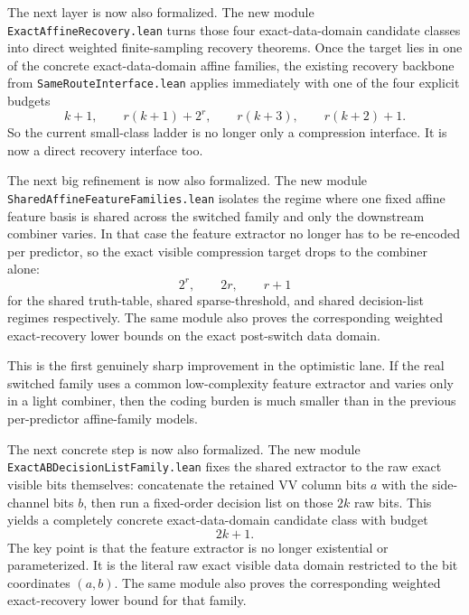 \documentclass[11pt]{article}
\theoremstyle{remark}
\begin{document}
The next layer is now also formalized.  The new module
\texttt{ExactAffineRecovery.lean} turns those four exact-data-domain candidate
classes into direct weighted finite-sampling recovery theorems.  Once the
target lies in one of the concrete exact-data-domain affine families, the existing
recovery backbone from \texttt{SameRouteInterface.lean} applies immediately
with one of the four explicit budgets
\[
  k+1, \qquad r(k+1)+2^r, \qquad r(k+3), \qquad r(k+2)+1.
\]
So the current small-class ladder is no longer only a compression interface.
It is now a direct recovery interface too.

The next big refinement is now also formalized.  The new module
\texttt{SharedAffineFeatureFamilies.lean} isolates the regime where one fixed
affine feature basis is shared across the switched family and only the
downstream combiner varies.  In that case the feature extractor no longer has
to be re-encoded per predictor, so the exact visible compression target drops
to the combiner alone:
\[
  2^r, \qquad 2r, \qquad r+1
\]
for the shared truth-table, shared sparse-threshold, and shared decision-list
regimes respectively.  The same module also proves the corresponding weighted
exact-recovery lower bounds on the exact post-switch data domain.

This is the first genuinely sharp improvement in the optimistic lane.  If the
real switched family uses a common low-complexity feature extractor and varies
only in a light combiner, then the coding burden is much smaller than in the
previous per-predictor affine-family models.

The next concrete step is now also formalized.  The new module
\texttt{ExactABDecisionListFamily.lean} fixes the shared extractor to the raw
exact visible bits themselves: concatenate the retained VV column bits \(a\)
with the side-channel bits \(b\), then run a fixed-order decision list on those
\(2k\) raw bits.  This yields a completely concrete exact-data-domain candidate
class with budget
\[
  2k + 1.
\]
The key point is that the feature extractor is no longer existential or
parameterized.  It is the literal raw exact visible data domain restricted to the
bit coordinates \((a,b)\).  The same module also proves the corresponding
weighted exact-recovery lower bound for that family.
\end{document}
